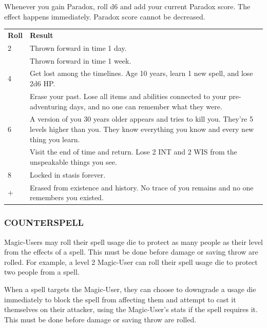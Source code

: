 \documentclass[twoside]{article}
\begin{document}
Whenever you gain Paradox, roll d6 and add your current Paradox score. The effect happens immediately. Paradox score cannot be decreased.

\bigbreak

\begin{center}
\noindent\begin{tabular}{>{\centering\arraybackslash}p{}p{}}
\textbf{Roll}&\textbf{Result}\\
\rowcolor[gray]{0.75}2&Thrown forward in time 1 day.\\
3&Thrown forward in time 1 week.\\
\rowcolor[gray]{0.75}4&Get lost among the timelines. Age 10 years, learn 1 new spell, and lose 2d6 HP.\\
5&Erase your past. Lose all items and abilities connected to your pre-adventuring days, and no one can remember what they were.\\
\rowcolor[gray]{0.75}6&A version of you 30 years older appears and tries to kill you. They're 5 levels higher than you. They know everything you know and every new thing you learn.\\
7&Visit the end of time and return. Lose 2 INT and 2 WIS from the unspeakable things you see.\\
\rowcolor[gray]{0.75}8&Locked in stasis forever.\\
9+&Erased from existence and history. No trace of you remains and no one remembers you existed.\\
\end{tabular}
\end{center}

\subsubsection*{\footnotesize{C}\scriptsize{OUNTERSPELL}\normalsize}

Magic-Users may roll their spell usage die to protect as many people as their level from the effects of a spell. This must be done before damage or saving throw are rolled. For example, a level 2 Magic-User can roll their spell usage die to protect two people from a spell. 

\bigbreak

When a spell targets the Magic-User, they can choose to downgrade a usage die immediately to block the spell from affecting them and attempt to cast it themselves on their attacker, using the Magic-User's stats if the spell requires it. This must be done before damage or saving throw are rolled.
\end{document}
